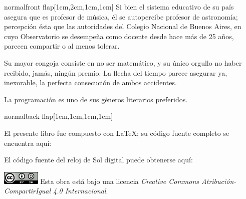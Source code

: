 \documentclass[coverwidth=148mm, coverheight=210mm, spinewidth=37mm,
flapwidth=7cm, wrapwidth=3mm, 11pt]{bookcover}
\begin{document}
\begin{bookcover}
\begin{bookcoverelement}{normal}{front flap}[1cm,2cm,1cm,1cm]
    \hspace{.5em} Si bien el sistema educativo de su país asegura que
    es profesor de música, él se autopercibe profesor de astronomía;
    percepción ésta que las autoridades del Colegio Nacional de Buenos
    Aires, en cuyo Observatorio se desempeña como docente desde hace
    más de 25 años, parecen compartir o al menos tolerar.

    \hspace{.5em} Su mayor congoja consiste en no ser
    matemático, y su único orgullo no haber recibido, jamás, ningún
    premio. La flecha del tiempo parece asegurar ya, inexorable, la
    perfecta consecución de ambos accidentes.

    \hspace{.5em} La programación es uno de sus géneros literarios
    preferidos.

  \end{bookcoverelement}

  \begin{bookcoverelement}{normal}{back flap}[1cm,1cm,1cm,1cm]

        El presente libro fue compuesto con \LaTeX; su código fuente
    completo se encuentra aquí:

    \begin{center}
      \colorbox{white}{%
        }
    \end{center}

    \bigskip
    
    El código fuente del reloj de Sol digital puede obtenerse aquí:

    \begin{center}
      \colorbox{white}{%
        }
    \end{center}

    
    \vfill


    \includegraphics[height=1.7em]{../cc-88x31} Esta obra está ba\-jo una
    licencia \emph{Creative Commons Atribución-CompartirIgual 4.0
      Internacional}.

    \begin{center}
      \colorbox{white}{%
        }
    \end{center}



\end{bookcoverelement}
\end{bookcover}
\end{document}
